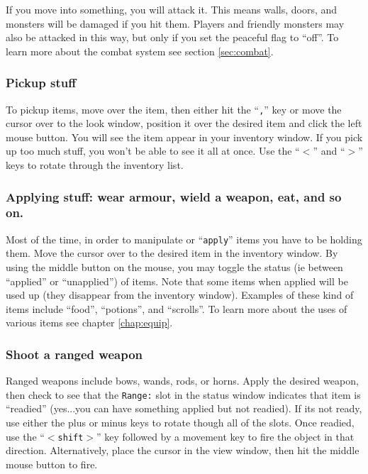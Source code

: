 If you move into something, you will attack it. This means walls,
doors, and monsters will be damaged if you hit them. Players and
friendly monsters may also be attacked in this way, but only if 
you set the peaceful flag to ``off''. To learn more about the combat
system see section \ref{sec:combat}. \\ 

\subsubsection{Pickup stuff}
To pickup items, move over the item, then either hit the ``{\tt ,}'' key 
or move the cursor over to the look window, position it over the desired
item and click the left mouse button. You will see the item appear in your 
inventory window. If you pick up too much stuff, you won't be
able to see it all at once. Use the ``{\tt $<$}'' and ``{\tt $>$}'' keys 
to rotate through the inventory list. \\ 

\subsubsection{Applying stuff: wear armour, wield a weapon, eat, and so on.} 
Most of the time, in order to manipulate or ``{\tt apply}'' items you have 
to be holding them. Move the cursor over to the desired item in the 
inventory window. By using the middle button on the mouse, you may 
toggle the status (ie between ``applied'' or ``unapplied'') of items. 
Note that 
some items when applied will be used up (they disappear from the 
inventory window). Examples of these kind of
items include ``food'', ``potions'', 
and ``scrolls''. 
To learn more
about the uses of various items see chapter \ref{chap:equip}. \\ 

\subsubsection{Shoot a ranged weapon}
Ranged weapons include bows, wands, 
rods, or horns. Apply the desired
weapon, then check to see that the {\tt Range:} slot in the status window
indicates that item is ``readied'' (yes...you can have something applied but
not readied). If its not ready, use either the plus or minus keys to 
rotate though all of the slots. Once readied, use the ``{\tt $<$shift$>$}'' key
followed by a movement key to fire the object in that direction. Alternatively,
place the cursor in the view window, then hit the middle mouse button to fire. \\ 

